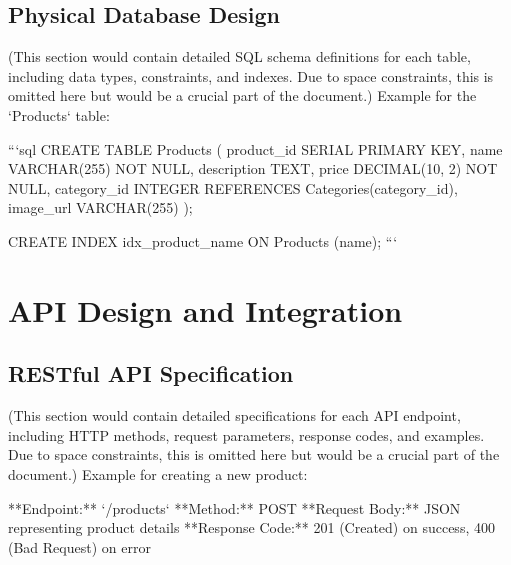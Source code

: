 \documentclass[11pt,a4paper,oneside]{article}
\begin{document}
\subsection{Physical Database Design}

(This section would contain detailed SQL schema definitions for each table, including data types, constraints, and indexes.  Due to space constraints, this is omitted here but would be a crucial part of the document.)  Example for the `Products` table:

```sql
CREATE TABLE Products (
    product_id SERIAL PRIMARY KEY,
    name VARCHAR(255) NOT NULL,
    description TEXT,
    price DECIMAL(10, 2) NOT NULL,
    category_id INTEGER REFERENCES Categories(category_id),
    image_url VARCHAR(255)
);

CREATE INDEX idx_product_name ON Products (name);
```

\section{API Design and Integration}

\subsection{RESTful API Specification}

(This section would contain detailed specifications for each API endpoint, including HTTP methods, request parameters, response codes, and examples.  Due to space constraints, this is omitted here but would be a crucial part of the document.)  Example for creating a new product:

**Endpoint:** `/products`
**Method:** POST
**Request Body:**  JSON representing product details
**Response Code:** 201 (Created) on success, 400 (Bad Request) on error
\end{document}

